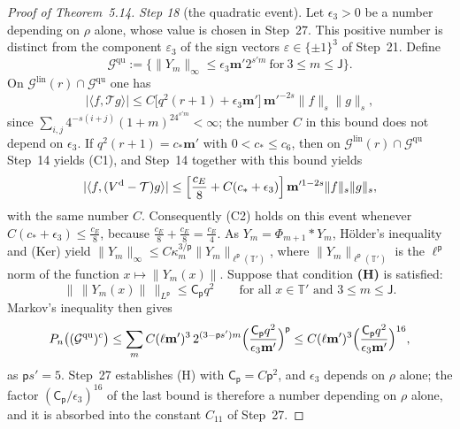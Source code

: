 \documentclass[11pt]{amsart}
\theoremstyle{definition}
\begin{document}
\begin{proof}[Proof of Theorem~5.14]
\emph{Step 18} (the quadratic event).
Let $\epsilon_3>0$ be a number depending on $\rho$ alone, whose value is chosen in Step~27.
This positive number is distinct from the component $\varepsilon_3$ of the sign vectors $\varepsilon\in\{\pm1\}^3$ of Step~21.
Define
\begin{equation*}
\mathcal G^{\mathrm{qu}}:=\bigl\{\|Y_m\|_\infty\le\epsilon_3\mathbf m'2^{s'm}\ \text{for}\ 3\le m\le\mathsf J\bigr\}.
\end{equation*}
On $\mathcal G^{\mathrm{lin}}(r)\cap\mathcal G^{\mathrm{qu}}$ one has
\begin{equation*}
|\langle f,\mathcal Tg\rangle|\le C\bigl[q^2(r+1)+\epsilon_3\mathbf m'\bigr]\,\mathbf m'^{-2s}\|f\|_s\|g\|_s,
\end{equation*}
since $\sum_{i,j}4^{-s(i+j)}(1+m)^24^{s'm}<\infty$;
the number $C$ in this bound does not depend on $\epsilon_3$.
If $q^2(r+1)=c_*\mathbf m'$ with $0<c_*\le c_6$, then on $\mathcal G^{\mathrm{lin}}(r)\cap\mathcal G^{\mathrm{qu}}$ Step~14 yields (C1), and Step~14 together with this bound yields
\begin{equation*}
|\langle f,(V^{\mathrm d}-\mathcal T)g\rangle|\le\Bigl[\frac{c_E}{8}+C(c_*+\epsilon_3)\Bigr]\,\mathbf m'^{1-2s}\|f\|_s\|g\|_s,
\end{equation*}
with the same number $C$.
Consequently (C2) holds on this event whenever $C(c_*+\epsilon_3)\le\frac{c_E}{8}$, because $\frac{c_E}{8}+\frac{c_E}{8}=\frac{c_E}{4}$.
As $Y_m=\Phi_{m+1}*Y_m$, H\"older's inequality and (Ker) yield $\|Y_m\|_\infty\le C\kappa_m^{3/\mathsf p}\|Y_m\|_{\ell^{\mathsf p}(\mathbb T')}$, where $\|Y_m\|_{\ell^{\mathsf p}(\mathbb T')}$ is the $\ell^{\mathsf p}$ norm of the function $x\mapsto\|Y_m(x)\|$.
Suppose that condition \textbf{(H)} is satisfied:
\begin{equation*}
\bigl\|\,\|Y_m(x)\|\,\bigr\|_{L^{\mathsf p}}\le\mathsf C_{\mathsf p}q^2\qquad\text{for all }x\in\mathbb T'\text{ and }3\le m\le\mathsf J.
\end{equation*}
Markov's inequality then gives
\begin{equation*}
P_n\bigl((\mathcal G^{\mathrm{qu}})^c\bigr)\le\sum_mC(\ell\mathbf m')^3\,2^{(3-\mathsf ps')m}\Bigl(\frac{\mathsf C_{\mathsf p}q^2}{\epsilon_3\mathbf m'}\Bigr)^{\mathsf p}\le C(\ell\mathbf m')^3\Bigl(\frac{\mathsf C_{\mathsf p}q^2}{\epsilon_3\mathbf m'}\Bigr)^{16},
\end{equation*}
as $\mathsf ps'=5$.
Step~27 establishes (H) with $\mathsf C_{\mathsf p}=C\mathsf p^2$, and $\epsilon_3$ depends on $\rho$ alone;
the factor $(\mathsf C_{\mathsf p}/\epsilon_3)^{16}$ of the last bound is therefore a number depending on $\rho$ alone, and it is absorbed into the constant $C_{11}$ of Step~27.


\end{proof}
\end{document}
